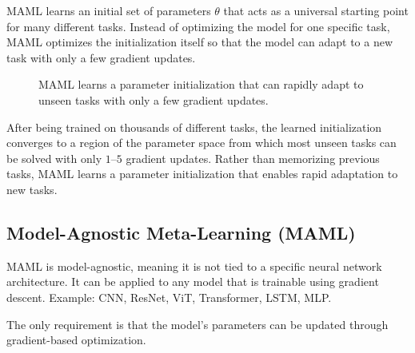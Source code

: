 MAML learns an initial set of parameters $\theta$ that acts as a universal starting point for many different tasks. Instead of optimizing the model for one specific task, MAML optimizes the initialization itself so that the model can adapt to a new task with only a few gradient updates.

\begin{figure}[H]
\centering
{}
\caption{MAML learns a parameter initialization that can rapidly adapt to unseen tasks with only a few gradient updates.}
\end{figure}

After being trained on thousands of different tasks, the learned initialization converges to a region of the parameter space from which most unseen tasks can be solved with only $1$--$5$ gradient updates. Rather than memorizing previous tasks, MAML learns a parameter initialization that enables rapid adaptation to new tasks.
\subsection*{Model-Agnostic Meta-Learning (MAML)}
MAML is model-agnostic, meaning it is not tied to a specific neural network architecture. It can be applied to any model that is trainable using gradient descent. Example: CNN, ResNet, ViT, Transformer, LSTM, MLP.

The only requirement is that the model's parameters can be updated through gradient-based optimization.

